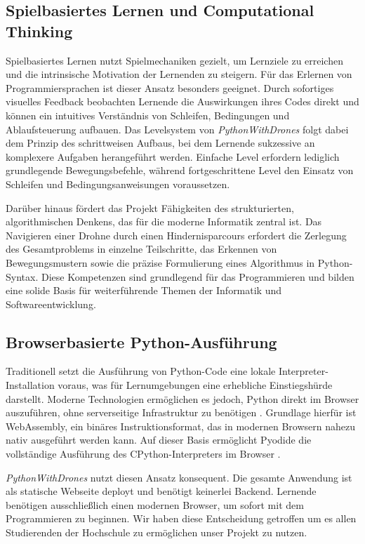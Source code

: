 \documentclass[a4paper,12pt]{article}
\begin{document}
	\subsection{Spielbasiertes Lernen und Computational Thinking}
	
	Spielbasiertes Lernen nutzt Spielmechaniken gezielt, um Lernziele zu
	erreichen und die intrinsische Motivation der Lernenden zu steigern. Für
	das Erlernen von Programmiersprachen ist dieser Ansatz besonders geeignet.
	Durch sofortiges visuelles Feedback beobachten Lernende die Auswirkungen
	ihres Codes direkt und können ein intuitives Verständnis von Schleifen,
	Bedingungen und Ablaufsteuerung aufbauen. Das Levelsystem von
	\textit{PythonWithDrones} folgt dabei dem Prinzip des
	schrittweisen Aufbaus, bei dem Lernende sukzessive an komplexere Aufgaben
	herangeführt werden. Einfache Level erfordern lediglich grundlegende
	Bewegungsbefehle, während fortgeschrittene Level den Einsatz von Schleifen
	und Bedingungsanweisungen voraussetzen.
	
	Darüber hinaus fördert das Projekt Fähigkeiten des strukturierten,
	algorithmischen Denkens, das für die moderne Informatik zentral ist. Das Navigieren 
	einer Drohne durch einen Hindernisparcours erfordert die Zerlegung des Gesamtproblems 
	in einzelne Teilschritte, das Erkennen von Bewegungsmustern sowie die präzise
	Formulierung eines Algorithmus in Python-Syntax. Diese Kompetenzen
	sind grundlegend für das Programmieren und bilden eine solide Basis
	für weiterführende Themen der Informatik und Softwareentwicklung.
	
	\subsection{Browserbasierte Python-Ausführung}
	
	Traditionell setzt die Ausführung von Python-Code eine lokale
	Interpreter-Installation voraus, was für Lernumgebungen eine erhebliche
	Einstiegshürde darstellt. Moderne Technologien ermöglichen es jedoch, Python 
	direkt im Browser auszuführen, ohne serverseitige Infrastruktur
	zu benötigen \cite{python}. Grundlage hierfür ist WebAssembly, ein binäres
	Instruktionsformat, das in modernen Browsern nahezu nativ ausgeführt
	werden kann. Auf dieser Basis ermöglicht Pyodide die vollständige
	Ausführung des CPython-Interpreters im Browser \cite{pyodide}.
	
	\textit{PythonWithDrones} nutzt diesen Ansatz konsequent. Die gesamte
	Anwendung ist als statische Webseite deployt und benötigt keinerlei
	Backend. Lernende benötigen ausschließlich einen modernen Browser, um
	sofort mit dem Programmieren zu beginnen. Wir haben diese Entscheidung 
	getroffen um es allen Studierenden der Hochschule zu ermöglichen unser 
	Projekt zu nutzen.
	
\end{document}
